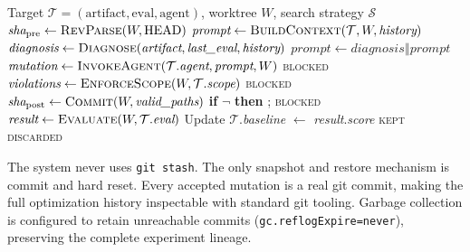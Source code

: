 \begin{algorithm}[t]
\caption{Core Experiment Loop (\texttt{ExperimentRunner.run\_one})}\label{alg:experiment-loop}
\begin{algorithmic}[1]
\Require Target $\mathcal{T} = (\text{artifact}, \text{eval}, \text{agent})$, worktree $W$, search strategy $\mathcal{S}$
\State $\textit{sha}_{\text{pre}} \gets \Call{RevParse}{W, \text{HEAD}}$
\State {} 
\State $\textit{prompt} \gets \Call{BuildContext}{\mathcal{T}, W, \textit{history}}$ 
    \State $\textit{diagnosis} \gets \Call{Diagnose}{\textit{artifact}, \textit{last\_eval}, \textit{history}}$
    \State $\textit{prompt} \gets \textit{diagnosis} \mathbin\Vert \textit{prompt}$
\EndIf
\State $\textit{mutation} \gets \Call{InvokeAgent}{\mathcal{T}.\textit{agent}, \textit{prompt}, W}$
    \State {}
    \State \Return \textsc{blocked}
\EndIf
\State $\textit{violations} \gets \Call{EnforceScope}{W, \mathcal{T}.\textit{scope}}$
    \State {}
    \State \Return \textsc{blocked}
\EndIf
\State $\textit{sha}_{\text{post}} \gets \Call{Commit}{W, \textit{valid\_paths}}$
    \State \textbf{if} $\lnot$ \textbf{then} ; \Return \textsc{blocked}
\EndIf
\State $\textit{result} \gets \Call{Evaluate}{W, \mathcal{T}.\textit{eval}}$
    \State Update $\mathcal{T}$.\textit{baseline} $\gets$ \textit{result}.\textit{score}
    \State \Return \textsc{kept}
\Else
    \State {}
    \State \Return \textsc{discarded}
\EndIf
\end{algorithmic}
\end{algorithm}

The system never uses \texttt{git stash}.
The only snapshot and restore mechanism is commit and hard reset.
Every accepted mutation is a real git commit, making the full optimization history inspectable with standard git tooling.
Garbage collection is configured to retain unreachable commits (\texttt{gc.reflogExpire=never}), preserving the complete experiment lineage.

